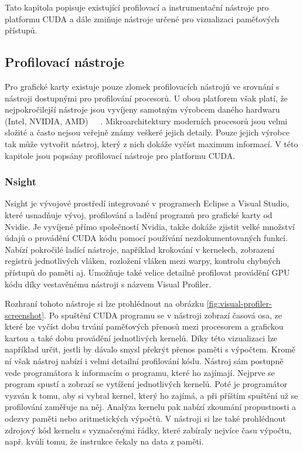 Tato kapitola popisuje existující profilovací a instrumentační nástroje pro platformu CUDA a dále zmiňuje nástroje určené pro vizualizaci paměťových přístupů.

\subsection{Profilovací nástroje}
Pro grafické karty existuje pouze zlomek profilovacích nástrojů ve srovnání s nástroji dostupnými pro profilování procesorů. U obou platforem však platí, že nejpokročilejší nástroje jsou vyvíjeny samotným výrobcem daného hardwaru (Intel, NVIDIA, AMD)~\cite{vtune}~\cite{nsight}~\cite{codexl}. Mikroarchitektury moderních procesorů jsou velmi složité a často nejsou veřejně známy veškeré jejich detaily. Pouze jejich výrobce tak může vytvořit nástroj, který z nich dokáže vyčíst maximum informací. V této kapitole jsou popsány profilovací nástroje pro platformu CUDA.

\subsubsection{Nsight}
Nsight je vývojové prostředí integrované v programech Eclipse a Visual Studio, které usnadňuje vývoj, profilování a ladění programů pro grafické karty od Nvidie. Je vyvíjené přímo společností Nvidia, takže dokáže zjistit velké množství údajů o provádění CUDA kódu pomocí používání nezdokumentovaných funkcí. Nabízí pokročilé ladící nástroje, například krokování v kernelech, zobrazení registrů jednotlivých vláken, rozložení vláken mezi warpy, kontrolu chybných přístupů do paměti aj. Umožňuje také velice detailně profilovat provádění GPU kódu díky vestavěnému nástroji s názvem Visual Profiler.

Rozhraní tohoto nástroje si lze prohlédnout na obrázku \ref{fig:visual-profiler-screenshot}. Po spuštění CUDA programu se v nástroji zobrazí časová osa, ze které lze vyčíst dobu trvání paměťových přenosů mezi procesorem a grafickou kartou a také dobu provádění jednotlivých kernelů. Díky této vizualizaci lze například určit, jestli by dávalo smysl překrýt přenos paměti s výpočtem. Kromě ní však nástroj nabízí i velmi detailní profilování kódu. Nástroj sám postupně vede programátora k informacím o programu, které ho zajímají. Nejprve se program spustí a zobrazí se vytížení jednotlivých kernelů. Poté je programátor vyzván k tomu, aby si vybral kernel, který ho zajímá, a při příštím spuštění už se profilování zaměřuje na něj. Analýza kernelu pak nabízí zkoumání propustnosti a odezvy paměti nebo aritmetických výpočtů. V nástroji si lze také prohlédnout zdrojový kód kernelu s vyznačenými řádky, které zabíraly nejvíce času výpočtu, např. kvůli tomu, že instrukce čekaly na data z paměti.

